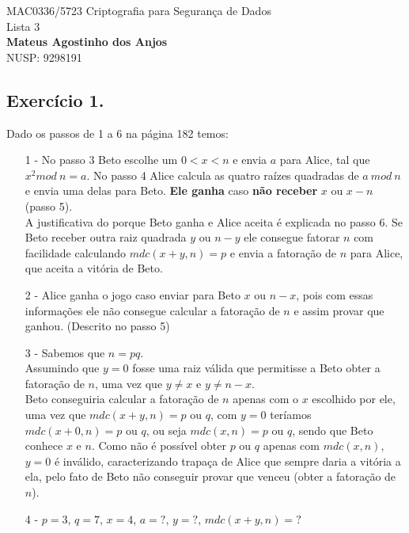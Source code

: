 \documentclass[12pt]{article}
\begin{document}
	\begin{center}
		{\Large MAC0336/5723 Criptografia para Segurança de Dados\\
		Lista 3}\\
		\textbf{Mateus Agostinho dos Anjos}\\
		NUSP: 9298191
	\end{center}

	\vspace{0.4 cm}
	
	\subsection*{Exercício 1.}
		Dado os passos de 1 a 6 na página 182 temos:
		\begin{itemize}			
			\item[1 -]
				No passo 3 Beto escolhe um $0 < x < n$ e envia $a$ para
				Alice, tal que $x^2 mod \ n = a$. No passo 4 Alice calcula as 
				quatro raízes quadradas de $a \ mod \ n$ e envia uma delas 
				para Beto. \textbf{Ele ganha} caso \textbf{não receber} $x$ ou 
				$x - n$ (passo 5).\\
				A justificativa do porque Beto ganha e Alice aceita é explicada
				no passo 6. Se Beto receber outra raiz quadrada $y$ ou
				$n - y$ ele consegue fatorar $n$ com facilidade calculando
				$mdc(x+y, n) = p$ e envia a fatoração de $n$ para Alice, que
				aceita a vitória de Beto.
			\item[2 -]
				Alice ganha o jogo caso enviar para Beto $x$ ou $n - x$, pois
				com essas informações ele não consegue calcular a fatoração
				de $n$ e assim provar que ganhou. (Descrito no passo 5)
			\item[3 -]
				Sabemos que $n = pq$.\\		
				Assumindo que $y = 0$ fosse uma raiz válida que permitisse
				a Beto obter a fatoração de $n$, uma vez que $y \neq x$ e
				$y \neq n - x$.\\
				Beto conseguiria calcular a fatoração de $n$ apenas com
				o $x$ escolhido por ele, uma vez que $mdc(x+y, n) = p$ ou $q$, 
				com $y = 0$ teríamos $mdc(x+0, n) = p$ ou $q$, ou
				seja $mdc(x, n) = p$ ou $q$, sendo que Beto conhece $x$ e $n$.
				Como não é possível obter $p$ ou $q$ apenas com $mdc(x, n)$,
				$y = 0$ é inválido, caracterizando trapaça de Alice que sempre daria a
				vitória a ela, pelo fato de Beto não conseguir provar que venceu 
				(obter a fatoração de $n$).
			\item[4 -]
				$p = 3$, $q = 7$, $x = 4$, $a = ?$, $y = ?$, $mdc(x + y, n) = ?$\\

\end{itemize}
\end{document}
